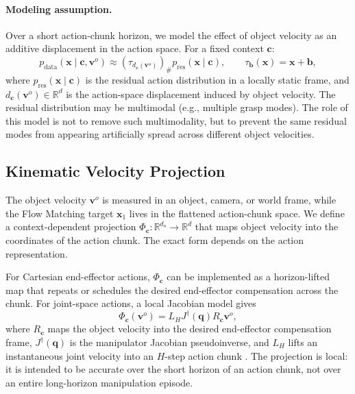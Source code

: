 \documentclass[10pt,twocolumn,letterpaper]{article}
\begin{document}
\paragraph{Modeling assumption.}
Over a short action-chunk horizon, we model the effect of object velocity as an
additive displacement in the action space. For a fixed context $\mathbf c$:
\begin{equation}
    p_{\mathrm{data}}(\mathbf x \mid \mathbf c, \mathbf v^{o})
    \approx
    \left(\tau_{d_{\mathbf c}(\mathbf v^{o})}\right)_{\#}
    p_{\mathrm{res}}(\mathbf x \mid \mathbf c),
    \qquad
    \tau_{\mathbf b}(\mathbf x) = \mathbf x + \mathbf b,
    \label{eq:velocity_pushforward_model}
\end{equation}
where $p_{\mathrm{res}}(\mathbf x \mid \mathbf c)$ is the residual action
distribution in a locally static frame, and
$d_{\mathbf c}(\mathbf v^{o}) \in \mathbb R^d$ is the action-space displacement
induced by object velocity. The residual distribution may be multimodal (e.g.,
multiple grasp modes). The role of this model is not to remove such
multimodality, but to prevent the same residual modes from appearing
artificially spread across different object velocities.

\subsection{Kinematic Velocity Projection}
\label{subsec:kinematic_projection}

The object velocity $\mathbf v^{o}$ is measured in an object, camera, or world
frame, while the Flow Matching target $\mathbf x_1$ lives in the flattened
action-chunk space. We define a context-dependent projection
$\Phi_{\mathbf c}:\mathbb R^{d_o}\rightarrow\mathbb R^d$ that maps object
velocity into the coordinates of the action chunk. The exact form depends on the
action representation.

For Cartesian end-effector actions, $\Phi_{\mathbf c}$ can be implemented as a
horizon-lifted map that repeats or schedules the desired end-effector
compensation across the chunk. For joint-space actions, a local Jacobian model
gives
\begin{equation}
    \Phi_{\mathbf c}(\mathbf v^{o})
    =
    L_H J^\dagger(\mathbf q) R_{\mathbf c}\mathbf v^{o},
    \label{eq:kinematic_projection}
\end{equation}
where $R_{\mathbf c}$ maps the object velocity into the desired end-effector
compensation frame, $J^\dagger(\mathbf q)$ is the manipulator Jacobian
pseudoinverse, and $L_H$ lifts an instantaneous joint velocity into an
$H$-step action chunk \citep{nakamura1991advanced,siciliano2009robotics}. The
projection is local: it is intended to be accurate over the short horizon of an
action chunk, not over an entire long-horizon manipulation episode.
\end{document}
